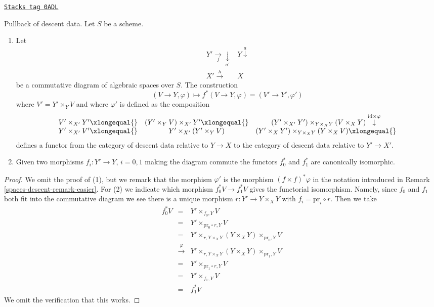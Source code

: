 \begin{lemma}[Pullback]
\label{spaces-descent-lemma-pullback}
\href{https://stacks.math.columbia.edu/tag/0ADL}{\texttt{Stacks tag 0ADL}}

Pullback of descent data. Let $S$ be a scheme.
\begin{enumerate}
\item Let
$$
\begin{array}{cc}Y' \underset{f}{\longrightarrow}\underset{a'}{\downarrow} & Y \overset{a}{\downarrow} \\ X' \overset{h}{\longrightarrow} & X\end{array}
$$
be a commutative diagram of algebraic spaces over $S$.
The construction
$$
(V \to Y, \varphi) \longmapsto f^*(V \to Y, \varphi) = (V' \to Y', \varphi')
$$
where $V' = Y' \times_Y V$ and where
$\varphi'$ is defined as the composition
$$
\begin{array}{ccc}V' \times_{X'} Y' \xlongequal{} & (Y' \times_Y V) \times_{X'} Y' \xlongequal{} & (Y' \times_{X'} Y') \times_{Y \times_X Y} (V \times_X Y)
\overset{\text{id} \times \varphi}{\downarrow} \\ Y' \times_{X'} V' \xlongequal{} & Y' \times_{X'} (Y' \times_Y V) & (Y' \times_X Y') \times_{Y \times_X Y} (Y \times_X V) \xlongequal{}\end{array}
$$
defines a functor from the category of descent data
relative to $Y \to X$ to the category of descent data
relative to $Y' \to X'$.
\item Given two morphisms $f_i : Y' \to Y$, $i = 0, 1$ making the
diagram commute the functors $f_0^*$ and $f_1^*$ are
canonically isomorphic.
\end{enumerate}
\end{lemma}

\begin{proof}
We omit the proof of (1), but we remark that the morphism
$\varphi'$ is the morphism $(f \times f)^*\varphi$ in the
notation introduced in Remark \ref{spaces-descent-remark-easier}.
For (2) we indicate which morphism
$f_0^*V \to f_1^*V$ gives the functorial isomorphism. Namely,
since $f_0$ and $f_1$ both fit into the commutative diagram
we see there is a unique morphism $r : Y' \to Y \times_X Y$
with $f_i = \text{pr}_i \circ r$. Then we take
\begin{eqnarray*}
f_0^*V & = &
Y' \times_{f_0, Y} V \\
& = &
Y' \times_{\text{pr}_0 \circ r, Y} V \\
& = &
Y' \times_{r, Y \times_X Y} (Y \times_X Y) \times_{\text{pr}_0, Y} V \\
& \xrightarrow{\varphi} &
Y' \times_{r, Y \times_X Y} (Y \times_X Y) \times_{\text{pr}_1, Y} V \\
& = &
Y' \times_{\text{pr}_1 \circ r, Y} V \\
& = &
Y' \times_{f_1, Y} V \\
& = & f_1^*V
\end{eqnarray*}
We omit the verification that this works.
\end{proof}

